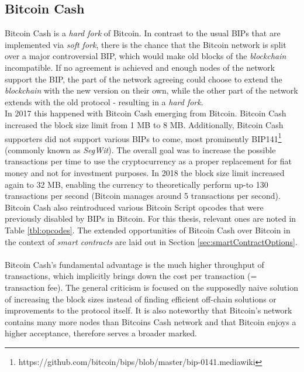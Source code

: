 \documentclass{cacthesis}
\newcounter{protocol}
\begin{document}
        \subsection{Bitcoin Cash}
        \label{sec:BitcoinCash}
        Bitcoin Cash is a \textit{hard fork} of Bitcoin. In contrast to the usual BIPs that are implemented via \textit{soft fork}, there is the chance that the Bitcoin network is split over a major controversial BIP, which would make old blocks of the \textit{blockchain} incompatible. If no agreement is achieved and enough nodes of the network support the BIP, the part of the network agreeing could choose to extend the \textit{blockchain} with the new version on their own, while the other part of the network extends with the old protocol - resulting in a \textit{hard fork}. \\
        In 2017 this happened with Bitcoin Cash emerging from Bitcoin. Bitcoin Cash increased the block size limit from 1 MB to 8 MB. Additionally, Bitcoin Cash supporters did not support various BIPs to come, most prominently BIP141\footnote{https://github.com/bitcoin/bips/blob/master/bip-0141.mediawiki} (commonly known as \textit{SegWit}). The overall goal was to increase the possible transactions per time to use the cryptocurrency as a proper replacement for fiat money and not for investment purposes. In 2018 the block size limit increased again to 32 MB, enabling the currency to theoretically perform up-to 130 transactions per second (Bitcoin manages around 5 transactions per second). Bitcoin Cash also reintroduced various Bitcoin Script opcodes that were previously disabled by BIPs in Bitcoin. For this thesis, relevant ones are noted in Table \ref{tbl:opcodes}. The extended opportunities of Bitcoin Cash over Bitcoin in the context of \textit{smart contracts} are laid out in Section \ref{sec:smartContractOptions}. \\\\
        Bitcoin Cash's fundamental advantage is the much higher throughput of transactions, which implicitly brings down the cost per transaction (= transaction fee). The general criticism is focused on the supposedly naive solution of increasing the block sizes instead of finding efficient off-chain solutions or improvements to the protocol itself. It is also noteworthy that Bitcoin's network contains many more nodes than Bitcoins Cash network and that Bitcoin enjoys a higher acceptance, therefore serves a broader marked.
        
\end{document}
